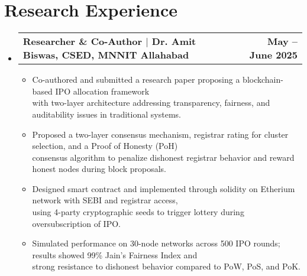 \documentclass[letterpaper,11pt]{article}
\makeatletter
\newcommand{\resumeItem}[1]{
  \item\small{
    {#1 \vspace{-2pt}}
  }
}
\newcommand{\resumeProjectHeading}[2]{
    \item
    \begin{tabular*}{1.001\textwidth}{l@{\extracolsep{\fill}}r}
      \small#1 & \textbf{\small #2}\\
    \end{tabular*}\vspace{-7pt}
}
\newcommand{\resumeSubHeadingListStart}{\begin{itemize}[leftmargin=0.0in, label={}]}
\newcommand{\resumeSubHeadingListEnd}{\end{itemize}}
\newcommand{\resumeItemListStart}{\begin{itemize}}
\newcommand{\resumeItemListEnd}{\end{itemize}\vspace{-5pt}}
\makeatother
\begin{document}
\section{Research Experience}
    \vspace{-5pt}
    \resumeSubHeadingListStart
     \resumeProjectHeading
          {{\textbf{Researcher \& Co-Author $|$ Dr. Amit Biswas, CSED, MNNIT Allahabad}}}{May -- June 2025}
          \resumeItemListStart
            \resumeItem{Co-authored and submitted a research paper proposing a blockchain-based IPO allocation framework\\ with two-layer architecture  addressing transparency, fairness, and auditability issues in traditional systems.}\vspace{2pt}
            \resumeItem{Proposed a two-layer consensus mechanism, registrar rating for cluster selection, and a Proof of Honesty (PoH)\\ consensus algorithm to penalize dishonest registrar behavior and reward honest nodes during block proposals.}\vspace{2pt}
            \resumeItem{Designed smart contract and implemented through solidity on Etherium network with SEBI and registrar access,\\ using 4-party cryptographic seeds to trigger lottery during oversubscription of IPO.}\vspace{2pt}
            \resumeItem{ Simulated performance on 30-node networks across 500 IPO rounds; results showed 99\% Jain’s Fairness Index and\\ strong resistance to dishonest behavior compared to PoW, PoS, and PoK.}\vspace{2pt}
          \resumeItemListEnd 
    \resumeSubHeadingListEnd
\vspace{-12pt}

\end{document}
